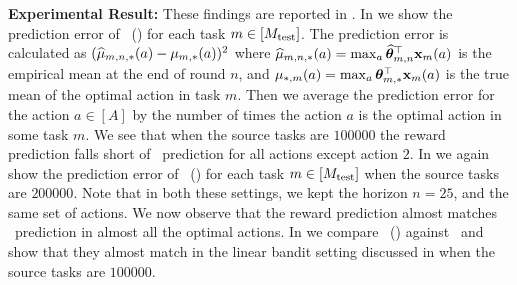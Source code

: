 \documentclass[10pt]{article}
\theoremstyle{plain}
\theoremstyle{definition}
\theoremstyle{remark}
\begin{document}
\textbf{Experimental Result:} These findings are reported in .
In  we show the prediction error of \pred\ (\gt) for each task $m\in[M_{\text{test}}]$. The prediction error is calculated as $(\widehat{\mu}_{m,n, *}(a) - \mu_{m, *}(a))^2$ where $\widehat{\mu}_{m,n, *}(a) = \max_a\widehat{\boldsymbol{\theta}}_{m,n}^\top\mathbf{x}_m(a)$ is the empirical mean at the end of round $n$, and $\mu_{*,m}(a)=\max_a\boldsymbol{\theta}_{m,*}^\top\mathbf{x}_m(a)$ is the true mean of the optimal action in task $m$. Then we average the prediction error for the action $a\in [A]$ by the number of times the action $a$ is the optimal action in some task $m$. We see that when the source tasks are $100000$ the reward prediction falls short of \linucb\ prediction for all actions except action $2$.
In  we again show the prediction error of \pred\ (\gt) for each task $m\in[M_{\text{test}}]$ when the source tasks are $200000$. Note that in both these settings, we kept the horizon $n=25$, and the same set of actions. We now observe that the reward prediction almost matches \linucb\ prediction in almost all the optimal actions.
In  we compare \pred\ (\gt) against \linucbt\ and show that they almost match in the linear bandit setting discussed in  when the source tasks are $100000$.
\end{document}
